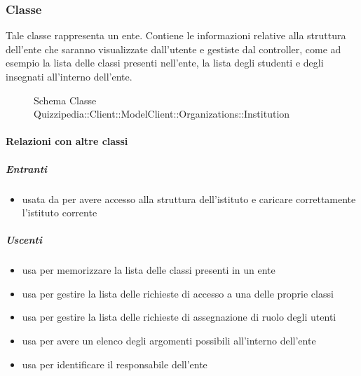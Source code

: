 \subsubsection{Classe }
Tale classe rappresenta un ente. Contiene le informazioni relative alla struttura dell'ente che saranno visualizzate dall'utente e gestiste dal controller, come ad esempio la lista delle classi presenti nell'ente, la lista degli studenti e degli insegnati all'interno dell'ente.
\begin{figure}[H]
\centering
\noindent{}
\caption[Schema Classe Institution]{Schema Classe Quizzipedia::Client::ModelClient::Organizations::Institution}
\end{figure}
\paragraph{Relazioni con altre classi}
\subparagraph{Entranti}
\begin{itemize}
\item usata da  per avere accesso alla struttura dell'istituto e caricare correttamente l'istituto corrente
\end{itemize}
\subparagraph{Uscenti}
\begin{itemize}
\item usa  per memorizzare la lista
delle classi presenti in un ente
\item usa  per gestire la lista delle richieste di accesso a una delle proprie classi
\item usa  per gestire la lista delle richieste di assegnazione di ruolo degli utenti
\item usa  per avere un elenco degli argomenti possibili all'interno dell'ente
\item usa  per identificare il responsabile dell'ente
\end{itemize}
